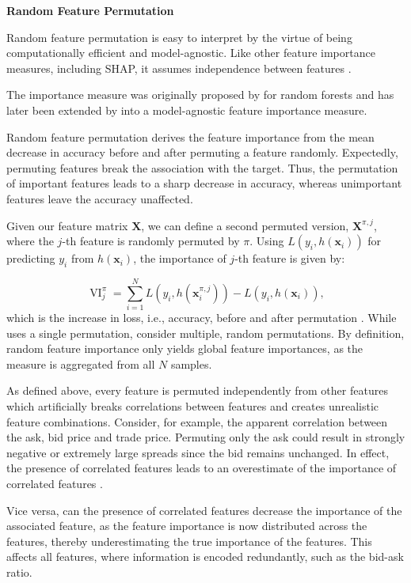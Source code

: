 \textbf{Random Feature Permutation}

Random feature permutation is easy to interpret by the virtue of being computationally efficient and model-agnostic. Like other feature importance measures, including \gls{SHAP}, it assumes independence between features \autocite[][2]{aasExplainingIndividualPredictions2021}.

The importance measure was originally proposed by \textcite[][23--24]{breimanRandomForests2001} for random forests and has later been extended by \textcite[][??]{fisherAllModelsAre} into a model-agnostic feature importance measure.

Random feature permutation derives the feature importance from the mean decrease in accuracy before and after permuting a feature randomly. Expectedly, permuting features break the association with the target. Thus, the permutation of important features leads to a sharp decrease in accuracy, whereas unimportant features leave the accuracy unaffected.

Given our feature matrix $\mathbf{X}$, we can define a second permuted version, $\mathbf{X}^{\pi,j}$, where the $j$-th feature is randomly permuted by $\pi$. Using $L(y_i, h(\mathbf{x}_i))$ for predicting $y_i$ from $h(\mathbf{x}_{i})$, the importance of $j$-th feature is given by:

$$
    \operatorname{VI}^{\pi}_{j} = \sum_{i=1}^{N} L(y_{i}, h(\mathbf{x}_{i}^{\pi,j})) - L(y_{i}, h(\mathbf{x}_{i})),
$$
which is the increase in loss, i.e., accuracy, before and after permutation \textcite[][82]{hookerUnrestrictedPermutationForces2021}. While \textcite[][23--24]{breimanRandomForests2001} uses a single permutation, \textcite[][??]{fisherAllModelsAre} consider multiple, random permutations. By definition, random feature importance only yields global feature importances, as the measure is aggregated from all $N$ samples.

As defined above, every feature is permuted independently from other features which artificially breaks correlations between features and creates unrealistic feature combinations. Consider, for example, the apparent correlation between the ask, bid price and trade price. Permuting only the ask could result in strongly negative or extremely large spreads since the bid remains unchanged. In effect, the presence of correlated features leads to an overestimate of the importance of correlated features \autocite[][3]{stroblConditionalVariableImportance2008}.

Vice versa, can the presence of correlated features decrease the importance of the associated feature, as the feature importance is now distributed across the features, thereby underestimating the true importance of the features. This affects all features, where information is encoded redundantly, such as the bid-ask ratio.

